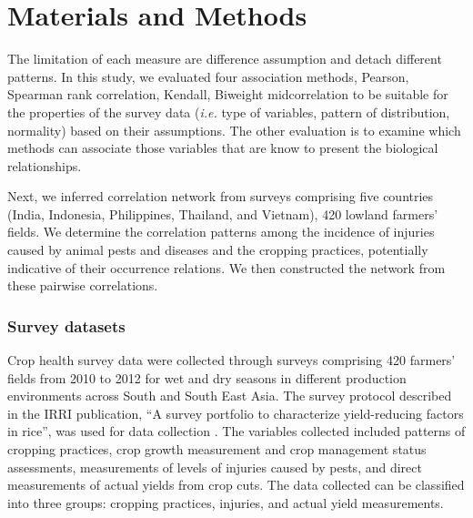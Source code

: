 \documentclass[a4paper]{article}
\begin{document}

\section*{Materials and Methods}

The limitation of each measure are difference assumption and detach different patterns. In this study, we evaluated four association methods, Pearson, Spearman rank correlation, Kendall, Biweight midcorrelation to be suitable for the properties of the survey data (\textit{i.e.} type of variables, pattern of distribution, normality) based on their assumptions.  The other evaluation is to examine which methods can associate those variables that are know to present the biological relationships. 

Next, we inferred correlation network from surveys comprising five countries (India, Indonesia, Philippines, Thailand, and Vietnam), 420 lowland farmers' fields. We determine the correlation patterns among the incidence of injuries caused by animal pests and diseases and the cropping practices, potentially indicative of their occurrence relations. We then constructed the network from these pairwise correlations. 

\subsubsection*{Survey datasets}
Crop health survey data were collected through surveys comprising 420 farmers' fields from 2010 to 2012 for wet and dry seasons in different production environments across South and South East Asia. The survey protocol described in the IRRI publication, ``A survey portfolio to characterize yield-reducing factors in rice'', was used for data collection \citep{Savarysurvey2009}. The variables collected included patterns of cropping practices, crop growth measurement and crop management status assessments, measurements of levels of injuries caused by pests, and direct measurements of actual yields from crop cuts. The data collected can be classified into three groups: cropping practices, injuries, and actual yield measurements.
\end{document}
